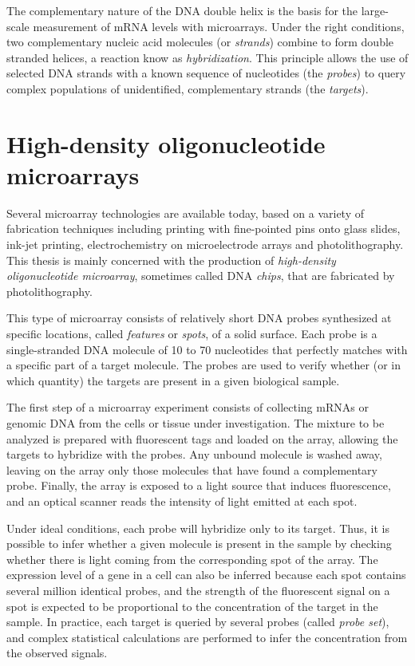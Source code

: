The complementary nature of the DNA double helix is the basis for the
large-scale measurement of mRNA levels with microarrays. Under the right
conditions, two complementary nucleic acid molecules (or \emph{strands}) combine
to form double stranded helices, a reaction know as \emph{hybridization}. This
principle allows the use of selected DNA strands with a known sequence of
nucleotides (the \emph{probes}) to query complex populations of unidentified,
complementary strands (the \emph{targets}).

\section{High-density oligonucleotide microarrays}
\label{sec:intro_dnachip}

Several microarray technologies are available today, based on a variety of
fabrication techniques including printing with fine-pointed pins onto glass
slides, ink-jet printing, electrochemistry on microelectrode arrays and
photolithography. This thesis is mainly concerned with the production of
\emph{high-density oligonucleotide microarray}, sometimes called DNA
\emph{chips}, that are fabricated by photolithography.

This type of microarray consists of relatively short DNA probes synthesized at
specific locations, called \emph{features} or \emph{spots}, of a solid surface.
Each probe is a single-stranded DNA molecule of 10 to 70 nucleotides that
perfectly matches with a specific part of a target molecule. The probes are used
to verify whether (or in which quantity) the targets are present in a given
biological sample.

The first step of a microarray experiment consists of collecting mRNAs or
genomic DNA from the cells or tissue under investigation. The mixture to be
analyzed is prepared with fluorescent tags and loaded on the array, allowing the
targets to hybridize with the probes. Any unbound molecule is washed away,
leaving on the array only those molecules that have found a complementary probe.
Finally, the array is exposed to a light source that induces fluorescence, and
an optical scanner reads the intensity of light emitted at each spot.

Under ideal conditions, each probe will hybridize only to its target.  Thus, it
is possible to infer whether a given molecule is present in the sample by
checking whether there is light coming from the corresponding spot of the array.
The expression level of a gene in a cell can also be inferred because each spot
contains several million identical probes, and the strength of the fluorescent
signal on a spot is expected to be proportional to the concentration of the
target in the sample. In practice, each target is queried by several probes
(called \emph{probe set}), and complex statistical calculations are performed to
infer the concentration from the observed signals.

